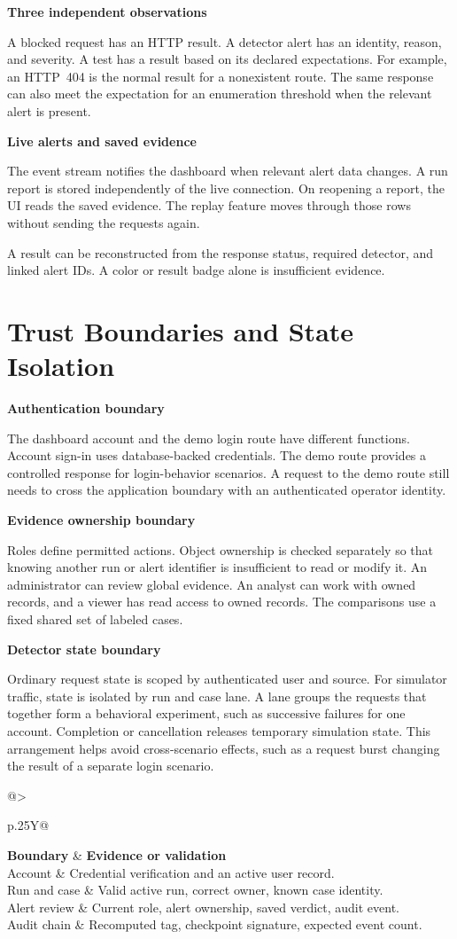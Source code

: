 \documentclass[11pt,letterpaper,oneside]{report}
\makeatletter
\newcommand{\topic}[1]{\smallskip\noindent\textbf{#1}\par\nobreak\vspace{-.39em}}
\newcommand{\sheet}[1]{\clearpage\section{#1}}
\newcommand{\tabletitle}[1]{\captionof{table}{#1}\smallskip}
\newcommand{\bodytable}[1]{\begin{tabularx}{\linewidth}{@{}>{\raggedright\arraybackslash}p{.25\linewidth}Y@{}}\toprule #1\bottomrule\end{tabularx}}
\newcommand{\callout}[1]{\noindent\colorbox{papergray}{\parbox{\dimexpr\linewidth-2\fboxsep\relax}{\small\strut #1\strut}}}
\makeatother
\begin{document}
\topic{Three independent observations}
A blocked request has an HTTP result. A detector alert has an identity, reason, and severity. A test has a result based on its declared expectations. For example, an HTTP~404 is the normal result for a nonexistent route. The same response can also meet the expectation for an enumeration threshold when the relevant alert is present.

\topic{Live alerts and saved evidence}
The event stream notifies the dashboard when relevant alert data changes. A run report is stored independently of the live connection. On reopening a report, the UI reads the saved evidence. The replay feature moves through those rows without sending the requests again.

\callout{A result can be reconstructed from the response status, required detector, and linked alert IDs. A color or result badge alone is insufficient evidence.}

\sheet{Trust Boundaries and State Isolation}
\topic{Authentication boundary}
The dashboard account and the demo login route have different functions. Account sign-in uses database-backed credentials. The demo route provides a controlled response for login-behavior scenarios. A request to the demo route still needs to cross the application boundary with an authenticated operator identity.

\topic{Evidence ownership boundary}
Roles define permitted actions. Object ownership is checked separately so that knowing another run or alert identifier is insufficient to read or modify it. An administrator can review global evidence. An analyst can work with owned records, and a viewer has read access to owned records. The comparisons use a fixed shared set of labeled cases.

\topic{Detector state boundary}
Ordinary request state is scoped by authenticated user and source. For simulator traffic, state is isolated by run and case lane. A lane groups the requests that together form a behavioral experiment, such as successive failures for one account. Completion or cancellation releases temporary simulation state. This arrangement helps avoid cross-scenario effects, such as a request burst changing the result of a separate login scenario.

\tabletitle{Evidence preserved at each boundary}
\bodytable{\textbf{Boundary} & \textbf{Evidence or validation}\\\midrule
Account & Credential verification and an active user record.\\
Run and case & Valid active run, correct owner, known case identity.\\
Alert review & Current role, alert ownership, saved verdict, audit event.\\
Audit chain & Recomputed tag, checkpoint signature, expected event count.\\}
\end{document}
